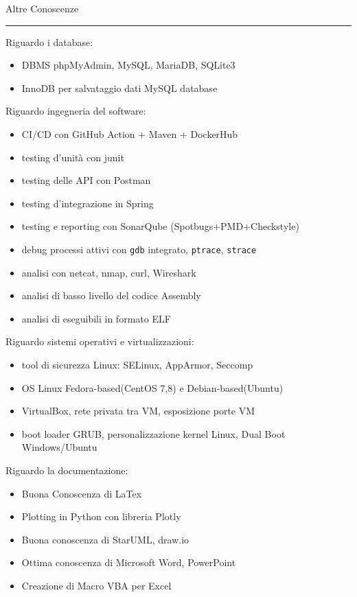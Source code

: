 \documentclass[a4paper]{letter}
\begin{document}
\hfill
\begin{minipage}[t]{0.65\textwidth}
\setlength{\baselineskip}{1.4\baselineskip}

\vspace{2 mm}
{\large Altre Conoscenze}
\rule{\linewidth}{0.4pt}
\vspace{1 mm}
{\medium Riguardo i database: }
\begin{itemize}
    \item DBMS phpMyAdmin, MySQL, MariaDB, SQLite3
    \item InnoDB per salvataggio dati MySQL database
\end{itemize}
\vspace{1 mm}
{\medium Riguardo ingegneria del software: }
\begin{itemize}
    \item CI/CD con GitHub Action + Maven + DockerHub
    \item testing d'unità con junit
    \item testing delle API con Postman
    \item testing d'integrazione in Spring
    \item testing e reporting con SonarQube (Spotbugs+PMD+Checkstyle)
    \item debug processi attivi con \texttt{gdb} integrato, \texttt{ptrace}, \texttt{strace}
    \item analisi con netcat, nmap, curl, Wireshark
    \item analisi di basso livello del codice Assembly
    \item analisi di eseguibili in formato ELF
\end{itemize}
\vspace{1 mm}
{\medium Riguardo sistemi operativi e virtualizzazioni: }
\begin{itemize}
    \item tool di sicurezza Linux: SELinux, AppArmor, Seccomp
    \item OS Linux Fedora-based(CentOS 7,8) e Debian-based(Ubuntu)  
    \item VirtualBox, rete privata tra VM, esposizione porte VM
    \item boot loader GRUB, personalizzazione kernel Linux, Dual Boot Windows/Ubuntu
\end{itemize}
\vspace{1 mm}
{\medium Riguardo la documentazione: }
\begin{itemize}
    \item Buona Conoscenza di LaTex
    \item Plotting in Python con libreria Plotly
    \item Buona conoscenza di StarUML, draw.io 
    \item Ottima conoscenza di Microsoft Word, PowerPoint
    \item Creazione di Macro VBA per Excel
\end{itemize}

\end{minipage}
\end{document}
